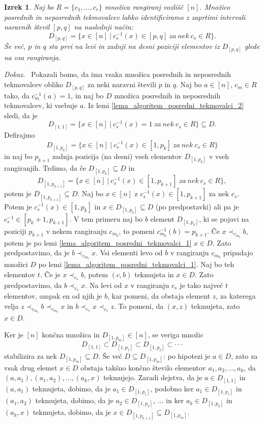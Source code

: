 \documentclass[a4paper, 12pt]{book}
\newtheorem{izrek}{Izrek}[chapter]
\newenvironment{dokaz}{\emph{Dokaz.}\ }{\hspace{\fill}{$\Box$}}
\begin{document}
\begin{izrek}
    Naj bo $R = \{ c_1, ..., c_r \}$ množica rangiranj vozlišč $[n]$. Množico posrednih in neposrednih tekmovalcev lahko identificiramo z zaprtimi intervali naravnih števil $[p, q]$ na naslednji način: 
    \[
        D_{[p, q]} = \{ x \in [n] \ | \ c_s^{-1}(x) \in [p, q] \ za \ nek \ c_s \in R\}.
    \]
    Še več, $p$ in $q$ sta prvi na levi in zadnji na desni poziciji elementov iz $D_{[p, q]}$ glede na vsa rangiranja.
\end{izrek}
\begin{dokaz}
    Pokazali bomo, da ima vsaka množica posrednih in neposrednih tekmovalcev obliko $D_{[p, q]}$ za neki naravni števili $p$ in $q$. Naj bo $a \in [n]$, $c_m \in R$ tako, da $c_m^{-1}(a) = 1$, in naj bo $D$ množica posrednih in neposrednih tekmovalcev, ki vsebuje $a$. Iz lemi \ref{lema_algoritem_posredni_tekmovalci_2} sledi, da je 
    \[ 
        D_{[1,1]} = \{ x \in [n] \ | \ c_s^{-1}(x) = 1 \ za \ nek \ c_s \in R \} \subseteq D.
    \] 
    Defirajmo 
    \[
        D_{[1, p_k]} = \{ x \in [n] \ | \ c_s^{-1}(x) \in [1, p_k] \ za \ nek \ c_s \in R\}
    \] 
    in naj bo $p_{k+1}$ zadnja pozicija (na desni) vseh elementov $D_{[1, p_k]}$ v vseh rangiranjih. Trdimo, da če $D_{[1, p_k]} \subseteq D$ in 
    \[
        D_{[1, p_{k+1}]} = \{ x \in [n] \ | \ c_s^{-1}(x) \in [1, p_{k+1}] \ za \ nek \ c_s \in R\},
    \] 
    potem je $D_{[1, p_{k+1}]} \subseteq D$. Naj bo $x \in [n]$ z $c_s^{-1}(x) \in [1, p_{k+1}]$ za nek $c_s$. Potem je $c_s^{-1}(x) \in [1, p_k]$ in $x \in D_{[1, p_k]} \subseteq D$ (po predpostavki) ali pa je $c_s^{-1} \in [p_k + 1, p_{k+1}]$. V tem primeru naj bo $b$ element $D_{[1,p_k]}$, ki se pojavi na poziciji $p_{k+1}$ v nekem rangiranju $c_{m_b}$, to pomeni $c_{m_b}^{-1}(b) = p_{k+1}$. Če $x \prec_{c_{m_b}} b$, potem je po lemi \ref{lema_algoritem_posredni_tekmovalci_1} $x \in D$. Zato predpostavimo, da je $b \prec_{c_{m_b}} x$. Vsi elementi levo od $b$ v rangiranju $c_{m_b}$ pripadajo množici $D$ po lemi \ref{lema_algoritem_posredni_tekmovalci_1}. Naj bo teh elementov $t$. Če je $x \prec_{c_s} b$, potem $(c, b)$ tekmujeta in $x \in D$. Zato predpostavimo, da $b \prec_{c_s} x$. Na levi od $x$ v rangiranju $c_s$ je tako največ $t$ elementov, ampak en od njih je $b$, kar pomeni, da obstaja element $z$, za katerega velja $z \prec_{c_{m_b}} b \prec_{c_{m_b}} x$ in $b \prec_{c_s} x \prec_{c_s} z$. To pomeni, da $(x, z)$ tekmujeta, zato $x \in D$.

    Ker je $[n]$ končna množica in $D_{[1, p_m]} \in [n]$, se veriga množic 
    \[
        D_{[1, 1]} \subset D_{[1, p_1]} \subset D_{[1, p_2]} \subset \cdot\cdot\cdot    
    \]
    stabilizira za nek $D_{[1, p_m]} \subseteq D$. Še več $D \subseteq D_{[1, p_m]}$: po hipotezi je $a \in D$, zato za vsak drug elemet $x \in D$ obstaja takšno končno število elementov $a_1, a_2, ..., a_k$, da $(a, a_1),(a_1, a_2), ..., (a_k, x)$ tekmujejo. Zaradi dejstva, da je $a \in D_{[1, 1]}$ in $(a, a_1)$ tekmujeta, dobimo, da je $a_1 \in D_{[1, p_1]}$, podobno ker $a_1 \in D_{[1, p_1]}$ in $(a_1, a_2)$ tekmujeta, dobimo, da je $a_2 \in D_{[1, p_2]}$, ... in ker $a_{k} \in D_{[1, p_k]}$ in $(a_k, x)$ tekmujeta, dobimo, da je $x \in D_{[1, p_{k+1}]} \subseteq D_{[1, p_m]}$.


\end{dokaz}
\end{document}
